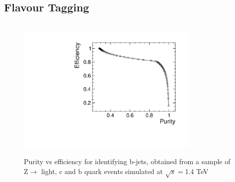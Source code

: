 \subsection{Flavour Tagging}
\label{Flavour Tagging}

\begin{figure}[t]
  \centering
  \includegraphics[width=0.78\textwidth,height=7cm,keepaspectratio]{HiggsAnalysis/figures/updatedpurityvsefficiency.pdf}
  \caption[B-Tagging Purity vs Efficiency]{Purity vs efficiency for identifying b-jets, obtained from a sample of Z$\rightarrow$ light, c and b quark events simulated at $\sqrt{s}=$1.4 TeV}
  \label{fig:Zbtagging}
\end{figure}


